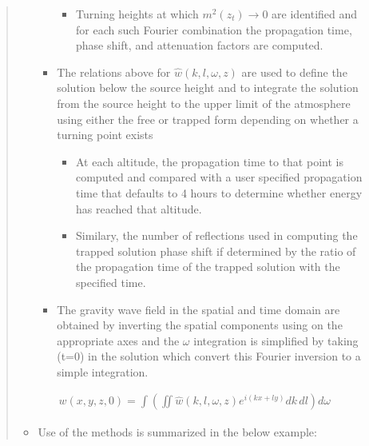 \documentclass[letterpaper,10pt,english]{sphinxmanual}
\begin{document}
\begin{itemize}
\begin{quote}
\begin{itemize}
\begin{itemize}
\begin{itemize}
\item {} 
Turning heights at which \(m^2 \left( z_t \right) \rightarrow 0\) are identified and for each such Fourier combination the propagation time, phase shift, and attenuation factors are computed.

\end{itemize}

\item {} 
The relations above for \(\hat{w} \left( k, l, \omega, z \right)\) are used to define the solution below the source height and to integrate the solution from the source height to the upper limit of the atmosphere using either the free or trapped form depending on whether a turning point exists
\begin{itemize}
\item {} 
At each altitude, the propagation time to that point is computed and compared with a user specified propagation time that defaults to 4 hours to determine whether energy has reached that altitude.

\item {} 
Similary, the number of reflections used in computing the trapped solution phase shift if determined by the ratio of the propagation time of the trapped solution with the specified time.

\end{itemize}

\item {} 
The gravity wave field in the spatial and time domain are obtained by inverting the spatial components using  on the appropriate axes and the \(\omega\) integration is simplified by taking (t=0) in the solution which convert this Fourier inversion to a simple integration.

\end{itemize}

\end{itemize}
\begin{equation*}
\begin{split}w \left( x, y, z, 0 \right) = \int{\left( \iint{ \hat{w} \left( k, l, \omega, z \right) e^{i \left( kx + ly \right)} dk \, dl} \right) d \omega}\end{split}
\end{equation*}\begin{itemize}
\item {} 
Use of the methods is summarized in the below example:

\end{itemize}


\end{quote}
\end{itemize}
\end{document}
